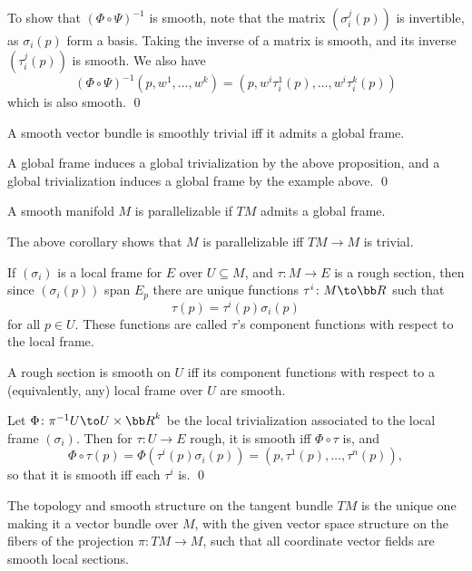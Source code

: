     To show that $(\Phi\circ\Psi)^{-1}$ is smooth, note that the matrix $(\sigma^j_i(p))$ is invertible, as $\sigma_i(p)$ form a basis.
    Taking the inverse of a matrix is smooth, and its inverse $(\tau^j_i(p))$ is smooth.
    We also have
    $$ (\Phi\circ\Psi)^{-1}(p,w^1,\dots,w^k) = (p,w^i\tau^1_i(p),\dots,w^i\tau^k_i(p)) $$
    which is also smooth.
    \qed

\eproof

\bcoro

    A smooth vector bundle is smoothly trivial iff it admits a global frame.

\ecoro

\bproof

    A global frame induces a global trivialization by the above proposition, and a global trivialization induces a global frame by the example above.
    \qed

\eproof

\bdefn

    A smooth manifold $M$ is {\emphcolor parallelizable} if $TM$ admits a global frame.

\edefn

The above corollary shows that $M$ is parallelizable iff $TM\to M$ is trivial.

If $(\sigma_i)$ is a local frame for $E$ over $U\subseteq M$, and $\tau\colon M\to E$ is a rough section, then since $(\sigma_i(p))$ span $E_p$ there are unique
functions $\tau^i\colon M\to\bR$ such that
$$ \tau(p) = \tau^i(p)\sigma_i(p) $$
for all $p\in U$.
These functions are called $\tau$'s {\emphcolor component functions} with respect to the local frame.

\bprop

    A rough section is smooth on $U$ iff its component functions with respect to a (equivalently, any) local frame over $U$ are smooth.

\eprop

\bproof

    Let $\Phi\colon\pi^{-1}U\to U\times\bR^k$ be the local trivialization associated to the local frame $(\sigma_i)$.
    Then for $\tau\colon U\to E$ rough, it is smooth iff $\Phi\circ\tau$ is, and
    $$ \Phi\circ\tau(p) = \Phi(\tau^i(p)\sigma_i(p)) = (p,\tau^1(p),\dots,\tau^n(p)) , $$
    so that it is smooth iff each $\tau^i$ is.
    \qed

\eproof

\bprop

    The topology and smooth structure on the tangent bundle $TM$ is the unique one making it a vector bundle over $M$, with the given
    vector space structure on the fibers of the projection $\pi\colon TM\to M$, such that all coordinate vector fields are smooth local sections.

